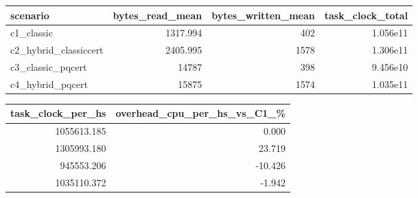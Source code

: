 \begin{tabular}{lrrr}
	\toprule
	scenario & bytes\_read\_mean & bytes\_written\_mean & task\_clock\_total \\
	\midrule
	c1\_classic & 1317.994 & 402 & 1.056e11 \\
	c2\_hybrid\_classiccert & 2405.995 & 1578 & 1.306e11 \\
	c3\_classic\_pqcert & 14787 & 398 & 9.456e10 \\
	c4\_hybrid\_pqcert & 15875 & 1574 & 1.035e11 \\
	\bottomrule
\end{tabular}

\vspace{1em}

\begin{tabular}{rr}
	\toprule
	task\_clock\_per\_hs & overhead\_cpu\_per\_hs\_vs\_C1\_\% \\
	\midrule
	1055613.185 & 0.000 \\
	1305993.180 & 23.719 \\
	945553.206 & -10.426 \\
	1035110.372 & -1.942 \\
	\bottomrule
\end{tabular}